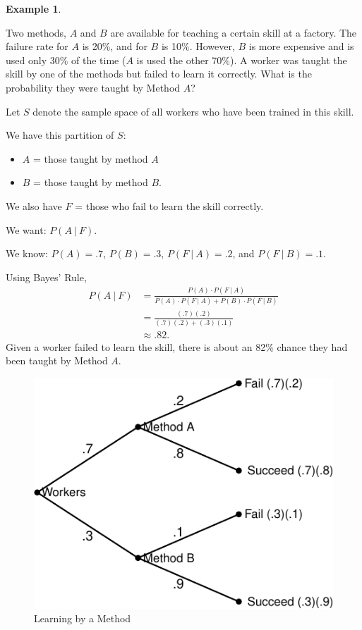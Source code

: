 \documentclass[
]{book}
\providecommand{\tightlist}{%
  \setlength{\itemsep}{0pt}\setlength{\parskip}{0pt}}
\theoremstyle{definition}
\theoremstyle{definition}
\newtheorem{example}{Example}[chapter]
\theoremstyle{definition}
\theoremstyle{definition}
\theoremstyle{remark}
\begin{document}
\begin{example}
\protect\hypertarget{exm:factory-skill}{}\label{exm:factory-skill}

Two methods, \(A\) and \(B\) are available for teaching a certain skill at a factory. The failure rate for \(A\) is 20\%, and for \(B\) is 10\%. However, \(B\) is more expensive and is used only 30\% of the time (\(A\) is used the other 70\%). A worker was taught the skill by one of the methods but failed to learn it correctly. What is the probability they were taught by Method \(A\)?

Let \(S\) denote the sample space of all workers who have been trained in this skill.

We have this partition of \(S\):

\begin{itemize}
\tightlist
\item
  \(A\) = those taught by method \(A\)
\item
  \(B\) = those taught by method \(B\).
\end{itemize}

We also have \(F\) = those who fail to learn the skill correctly.

We want: \(P(A~|~F)\).

We know: \(P(A) = .7\), \(P(B) = .3\), \(P(F~|~A) = .2\), and \(P(F~|~B) = .1\).

Using Bayes' Rule,
\begin{align*}
P(A~|~F) &= \frac{P(A)\cdot P(F~|~A)}{P(A)\cdot P(F~|~A)+P(B)\cdot P(F~|~B)}\\
&= \frac{(.7)(.2)}{(.7)(.2)+(.3)(.1)}\\
&\approx .82.
\end{align*}
Given a worker failed to learn the skill, there is about an 82\% chance they had been taught by Method \(A\).

\begin{figure}
\centering
\includegraphics{math340-notes_files/figure-latex/bayes-instruct-method-1.pdf}
\caption{\label{fig:bayes-instruct-method}Learning by a Method}
\end{figure}

\end{example}
\end{document}
